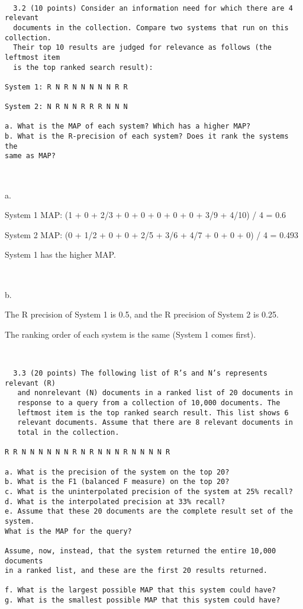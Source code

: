 \documentclass[12pt]{article}
\begin{document}
\

\begin{verbatim}
  3.2 (10 points) Consider an information need for which there are 4 relevant
  documents in the collection. Compare two systems that run on this collection. 
  Their top 10 results are judged for relevance as follows (the leftmost item 
  is the top ranked search result):

System 1: R N R N N N N N R R

System 2: N R N N R R R N N N

a. What is the MAP of each system? Which has a higher MAP?
b. What is the R-precision of each system? Does it rank the systems the 
same as MAP?
\end{verbatim}

\

a.

System 1 MAP: (1 + 0 + 2/3 + 0 + 0 + 0 + 0 + 0 + 3/9 + 4/10) / 4 = 0.6

System 2 MAP: (0 + 1/2 + 0 + 0 + 2/5 + 3/6 + 4/7 + 0 + 0 + 0) / 4 = 0.493

System 1 has the higher MAP.

\

b.

The R precision of System 1 is 0.5, and the R precision of System 2 is 0.25.

The ranking order of each system is the same (System 1 comes first).

\


\begin{verbatim}
  3.3 (20 points) The following list of R’s and N’s represents relevant (R)
   and nonrelevant (N) documents in a ranked list of 20 documents in
   response to a query from a collection of 10,000 documents. The 
   leftmost item is the top ranked search result. This list shows 6
   relevant documents. Assume that there are 8 relevant documents in
   total in the collection.

R R N N N N N N R N R N N N R N N N N R

a. What is the precision of the system on the top 20?
b. What is the F1 (balanced F measure) on the top 20?
c. What is the uninterpolated precision of the system at 25% recall?
d. What is the interpolated precision at 33% recall?
e. Assume that these 20 documents are the complete result set of the system.
What is the MAP for the query?

Assume, now, instead, that the system returned the entire 10,000 documents
in a ranked list, and these are the first 20 results returned.

f. What is the largest possible MAP that this system could have?
g. What is the smallest possible MAP that this system could have?
\end{verbatim}
\end{document}
